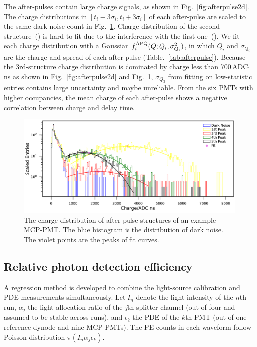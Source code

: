 The after-pulses contain large charge signals, as shown in Fig.~\ref{fig:afterpulse2d}. The charge distributions in $[t_i-3\sigma_i,t_i+3\sigma_i]$ of each after-pulse are scaled to the same dark noise count in Fig.~\ref{fig:afterpulsecharge}.  Charge distribution of the second structure~() is hard to fit due to the interference with the first one~().  We fit each charge distribution with a Gaussian $f^{\rm APQ}_i(Q;Q_i,\sigma_{Q_i}^2)$, in which $Q_i$ and $\sigma_{Q_i}$ are the charge and spread of each after-pulse (Table.~\ref{tab:afterpulse}). Because the 3rd-structure charge distribution is dominated by charge less than 700\,ADC$\cdot$ns as shown in Fig.~\ref{fig:afterpulse2d} and Fig.~\ref{fig:afterpulsecharge}, $\sigma_{Q_3}$ from fitting on low-statistic entries contains large uncertainty and maybe unreliable. From the six PMTs with higher occupancies, the mean charge of each after-pulse shows a negative correlation between charge and delay time.

\begin{figure}[!htbp]
    \centering
    \includegraphics[width=\textwidth]{figures/method/triggerafterpulseCharge.pdf}
    \caption{The charge distribution of after-pulse structures of an example MCP-PMT. The blue histogram is the distribution of dark noise. The violet points are the peaks of fit curves.}
    \label{fig:afterpulsecharge}
\end{figure}

\subsection{Relative photon detection efficiency}
\label{sec:PDE}
A regression method is developed to combine the light-source calibration and PDE measurements simultaneously. Let $I_n$ denote the light intensity of the $n$th run, $\alpha_j$ the light allocation ratio of the $j$th splitter channel (out of four and assumed to be stable across runs), and $\epsilon_k$ the PDE of the $k$th PMT (out of one reference dynode and nine MCP-PMTs). The PE counts in each waveform follow Poisson distribution $\pi(I_n\alpha_j\epsilon_k)$.

